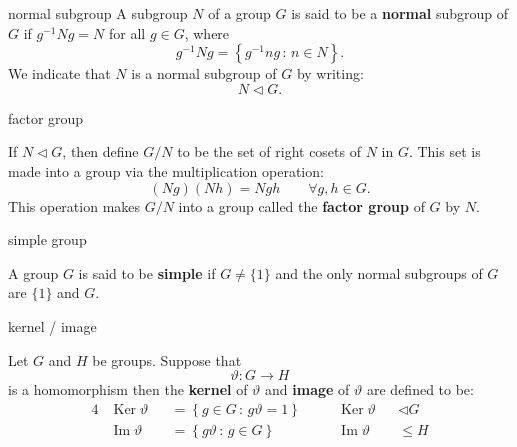 \documentclass[avery5371,grid]{flashcards}
\renewcommand{\le}{\leqslant}
\renewcommand{\theta}{\vartheta}
\newcommand{\set}[2]{\ensuremath{\left\{ #1 \, : \, #2 \right\}}}
\newcommand{\normal}{\ensuremath{\lhd}}
\DeclareMathOperator{\Ker}{\ensuremath{\textrm{Ker}}}
\DeclareMathOperator{\Img}{\ensuremath{\textrm{Im}}}
\newcommand{\defn}[1]{\textbf{#1}}
\begin{document}
\begin{flashcard}[Definition]{normal subgroup}
  A subgroup $N$ of a group $G$ is said to be a \defn{normal} subgroup
  of $G$ if $g^{-1}Ng = N$ for all $g \in G$, where
  \[
    g^{-1}Ng = \set{g^{-1}ng}{n \in N}.
  \]
We indicate that $N$ is a normal subgroup of $G$ by writing:
  \[
    N \normal G.
  \]
\end{flashcard}

\begin{flashcard}[Definition]{factor group}

  If $N \normal G$, then define $G/N$ to be the set of right cosets of
  $N$ in $G$. This set is made into a group via the multiplication
  operation:
  \[
    (Ng)(Nh) = Ngh \qquad \forall g, h \in G.
  \]
  This operation makes $G/N$ into a group called the \defn{factor
    group} of $G$ by $N$.

\end{flashcard}

\begin{flashcard}[Definition]{simple group}

  A group $G$ is said to be \defn{simple} if $G \ne \{ 1 \}$ and the
  only normal subgroups of $G$ are $\{ 1 \}$ and $G$.
\end{flashcard}

\begin{flashcard}[Definition]{kernel / image}

  Let $G$ and $H$ be groups. Suppose that \[\theta : G \to H\] is a
  homomorphism then the \defn{kernel} of $\theta$ and \defn{image}
  of $\theta$ are defined to be:
  \begin{alignat*}{4}
    &\Ker \theta
    &&= \set{g \in G}{g\theta = 1} \quad
    && \Ker \theta &&\normal G \\
    &\Img \theta
    &&= \set{g\theta}{g \in G} \quad
    && \Img \theta &&\le H
  \end{alignat*}

\end{flashcard}
\end{document}
